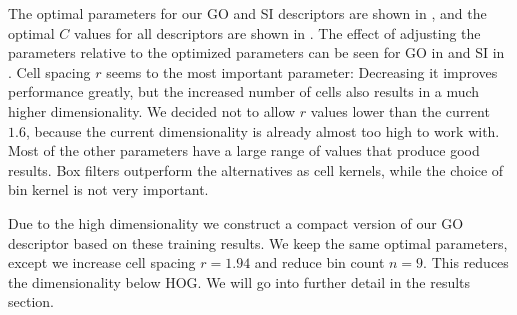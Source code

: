 \documentclass[thesis.tex]{subfiles}
\begin{document}
The optimal parameters for our GO and SI descriptors are shown in , and the optimal $C$ values for all descriptors are shown in . The effect of adjusting the parameters relative to the optimized parameters can be seen for GO in  and SI in . Cell spacing $r$ seems to the most important parameter: Decreasing it improves performance greatly, but the increased number of cells also results in a much higher dimensionality. We decided not to allow $r$ values lower than the current $1.6$, because the current dimensionality is already almost too high to work with. Most of the other parameters have a large range of values that produce good results. Box filters outperform the alternatives as cell kernels, while the choice of bin kernel is not very important.

Due to the high dimensionality we construct a compact version of our GO descriptor based on these training results. We keep the same optimal parameters, except we increase cell spacing $r = 1.94$ and reduce bin count $n = 9$. This reduces the dimensionality below HOG. We will go into further detail in the results section.
\end{document}
